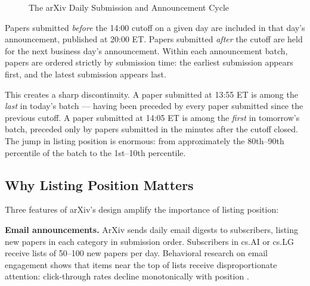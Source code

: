 \documentclass[12pt]{article}
\begin{document}
\begin{figure}[H]
\centering
{}
\caption{The arXiv Daily Submission and Announcement Cycle}
\label{fig:timeline}
\end{figure}

Papers submitted \textit{before} the 14:00 cutoff on a given day are included in that day's announcement, published at 20:00 ET. Papers submitted \textit{after} the cutoff are held for the next business day's announcement. Within each announcement batch, papers are ordered strictly by submission time: the earliest submission appears first, and the latest submission appears last.

This creates a sharp discontinuity. A paper submitted at 13:55 ET is among the \textit{last} in today's batch --- having been preceded by every paper submitted since the previous cutoff. A paper submitted at 14:05 ET is among the \textit{first} in tomorrow's batch, preceded only by papers submitted in the minutes after the cutoff closed. The jump in listing position is enormous: from approximately the 80th--90th percentile of the batch to the 1st--10th percentile.

\subsection{Why Listing Position Matters}

Three features of arXiv's design amplify the importance of listing position:

\textbf{Email announcements.} ArXiv sends daily email digests to subscribers, listing new papers in each category in submission order. Subscribers in cs.AI or cs.LG receive lists of 50--100 new papers per day. Behavioral research on email engagement shows that items near the top of lists receive disproportionate attention: click-through rates decline monotonically with position \citep{feenberg2017}.
\end{document}
